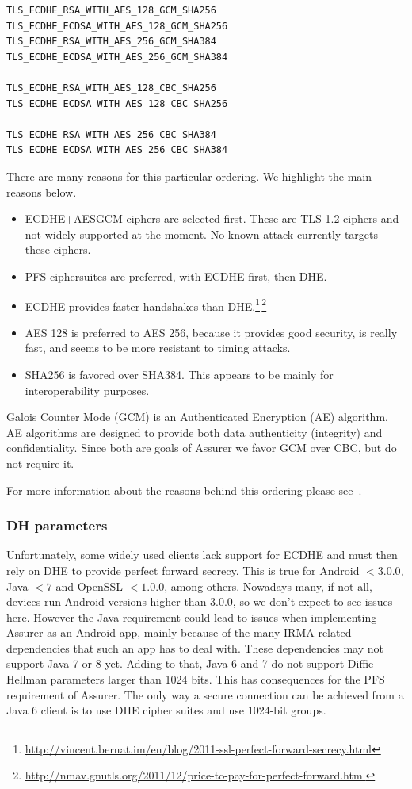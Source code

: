 \begin{verbatim}
TLS_ECDHE_RSA_WITH_AES_128_GCM_SHA256
TLS_ECDHE_ECDSA_WITH_AES_128_GCM_SHA256
TLS_ECDHE_RSA_WITH_AES_256_GCM_SHA384
TLS_ECDHE_ECDSA_WITH_AES_256_GCM_SHA384

TLS_ECDHE_RSA_WITH_AES_128_CBC_SHA256
TLS_ECDHE_ECDSA_WITH_AES_128_CBC_SHA256

TLS_ECDHE_RSA_WITH_AES_256_CBC_SHA384
TLS_ECDHE_ECDSA_WITH_AES_256_CBC_SHA384
\end{verbatim}

There are many reasons for this particular ordering. We highlight the main reasons below. 

\begin{itemize}
  \item ECDHE+AESGCM ciphers are selected first. These are TLS 1.2 ciphers and not widely supported at the moment. No known attack currently targets these ciphers.
  \item PFS ciphersuites are preferred, with ECDHE first, then DHE.
	\item ECDHE provides faster handshakes than DHE.\footnote{\url{http://vincent.bernat.im/en/blog/2011-ssl-perfect-forward-secrecy.html}}\,\footnote{\url{http://nmav.gnutls.org/2011/12/price-to-pay-for-perfect-forward.html}}
  \item AES 128 is preferred to AES 256, because it provides good security, is really fast, and seems to be more resistant to timing attacks.
  \item SHA256 is favored over SHA384. This appears to be mainly for interoperability purposes.
\end{itemize}

Galois Counter Mode (GCM) is an Authenticated Encryption (AE) algorithm. AE algorithms are designed to provide both data authenticity (integrity) and confidentiality. Since both are goals of Assurer we favor GCM over CBC, but do not require it.

For more information about the reasons behind this ordering please see~\cite{mozilla}.

\subsubsection{DH parameters}
Unfortunately, some widely used clients lack support for ECDHE and must then rely on DHE to provide perfect forward secrecy. This is true for Android $< 3.0.0$, Java $< 7$ and OpenSSL $< 1.0.0$, among others. Nowadays many, if not all, devices run Android versions higher than 3.0.0, so we don't expect to see issues here. However the Java requirement could lead to issues when implementing Assurer as an Android app, mainly because of the many IRMA-related dependencies that such an app has to deal with. These dependencies may not support Java 7 or 8 yet. Adding to that, Java 6 and 7 do not support Diffie-Hellman parameters larger than 1024 bits. This has consequences for the PFS requirement of Assurer. The only way a secure connection can be achieved from a Java 6 client is to use DHE cipher suites and use 1024-bit groups.

